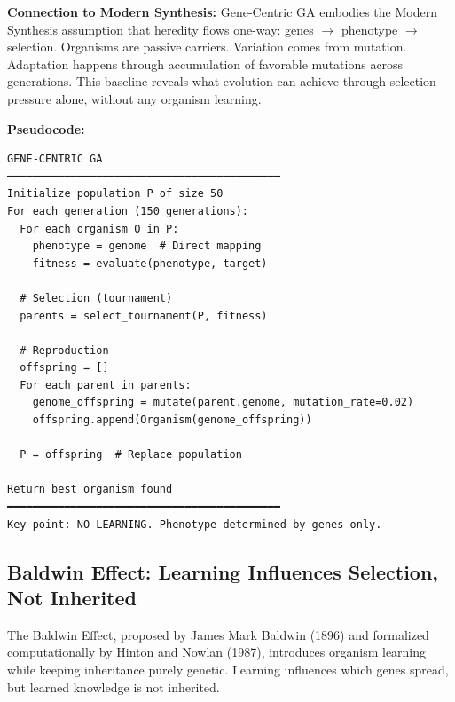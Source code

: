 \documentclass[12pt]{article}
\begin{document}
\textbf{Connection to Modern Synthesis:} Gene-Centric GA embodies the Modern Synthesis assumption that heredity flows one-way: genes $\rightarrow$ phenotype $\rightarrow$ selection. Organisms are passive carriers. Variation comes from mutation. Adaptation happens through accumulation of favorable mutations across generations. This baseline reveals what evolution can achieve through selection pressure alone, without any organism learning.

\textbf{Pseudocode:}
\begin{verbatim}
GENE-CENTRIC GA
━━━━━━━━━━━━━━━━━━━━━━━━━━━━━━━━━━━━━━━━━━━
Initialize population P of size 50
For each generation (150 generations):
  For each organism O in P:
    phenotype = genome  # Direct mapping
    fitness = evaluate(phenotype, target)

  # Selection (tournament)
  parents = select_tournament(P, fitness)

  # Reproduction
  offspring = []
  For each parent in parents:
    genome_offspring = mutate(parent.genome, mutation_rate=0.02)
    offspring.append(Organism(genome_offspring))

  P = offspring  # Replace population

Return best organism found
━━━━━━━━━━━━━━━━━━━━━━━━━━━━━━━━━━━━━━━━━━━
Key point: NO LEARNING. Phenotype determined by genes only.
\end{verbatim}

\subsection*{Baldwin Effect: Learning Influences Selection, Not Inherited}

The Baldwin Effect, proposed by James Mark Baldwin (1896) and formalized computationally by Hinton and Nowlan (1987), introduces organism learning while keeping inheritance purely genetic. Learning influences which genes spread, but learned knowledge is not inherited.
\end{document}
